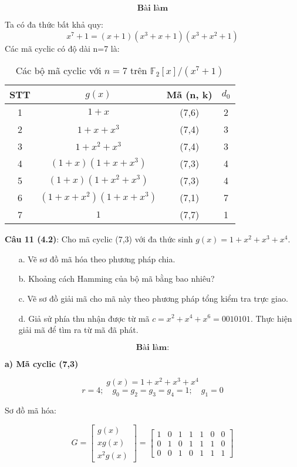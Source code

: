\documentclass[12pt]{article}
\begin{document}
\[
\textbf{Bài làm}
\]

Ta có đa thức bất khả quy:
\[
x^7 + 1 = (x + 1)(x^3 + x + 1)(x^3 + x^2 + 1)
\]
Các mã cyclic có độ dài n=7 là:
\begin{table}[h!]
\centering
\begin{tabular}{|c|c|c|c|}
\hline
\textbf{STT} & \boldmath$g(x)$ & \textbf{Mã (n, k)} & \boldmath$d_0$ \\
\hline
1 & $1 + x$ & (7,6) & 2 \\
2 & $1 + x + x^3$ & (7,4) & 3 \\
3 & $1 + x^2 + x^3$ & (7,4) & 3 \\
4 & $(1 + x)(1 + x + x^3)$ & (7,3) & 4 \\
5 & $(1 + x)(1 + x^2 + x^3)$ & (7,3) & 4 \\
6 & $(1 + x + x^2)(1 + x + x^3)$ & (7,1) & 7 \\
7 & $1$ & (7,7) & 1 \\
\hline
\end{tabular}
\caption{Các bộ mã cyclic với $n = 7$ trên $\mathbb{F}_2[x]/(x^7 + 1)$}
\end{table}

\newpage
\textbf{Câu 11 (4.2)}: Cho mã cyclic (7,3) với đa thức sinh \( g(x) = 1 + x^2 + x^3 + x^4 \).

\begin{enumerate}
    \item[a.] Vẽ sơ đồ mã hóa theo phương pháp chia.
    \item[b.] Khoảng cách Hamming của bộ mã bằng bao nhiêu?
    \item[c.] Vẽ sơ đồ giải mã cho mã này theo phương pháp tổng kiểm tra trực giao.
    \item[d.] Giả sử phía thu nhận được từ mã \( c = x^2 + x^4 + x^6 = 0010101 \). Thực hiện giải mã để tìm ra từ mã đã phát.
\end{enumerate}

\[
\textbf{Bài làm:}
\]

\textbf{a) Mã cyclic (7,3)}

\[
g(x) = 1 + x^2 + x^3 + x^4
\]
\[
r = 4;\quad g_0 = g_2 = g_3 = g_4 = 1;\quad g_1 = 0
\]

Sơ đồ mã hóa:


\[
G = 
\begin{bmatrix}
g(x) \\
xg(x) \\
x^2g(x)
\end{bmatrix}
=
\begin{bmatrix}
1 & 0 & 1 & 1 & 1 & 0 & 0 \\
0 & 1 & 0 & 1 & 1 & 1 & 0 \\
0 & 0 & 1 & 0 & 1 & 1 & 1
\end{bmatrix}
\]
\end{document}
